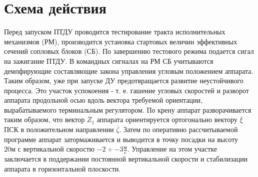 \section{Схема действия}
Перед запуском ПТДУ проводится тестирование тракта исполнительных механизмов (РМ), производится установка стартовых величин эффективных сечений сопловых блоков (СБ). По завершению тестового режима подается сигал на зажигание ПТДУ. В командных сигналах на РМ СБ учитываются демпфирующие составляющие закона управления угловым положением аппарата. Таким образом, уже при запуске ДУ предотвращается развитие неустойчивого процесса. Это участок успокоения - т. е. гашение угловых скоростей и разворот аппарата продольной осью вдоль вектора требуемой ориентации, вырабатываемого терминальным регулятором. По крену аппарат разворачивается таким образом, что вектор $\overline{Z}_1$ аппарата ориентируется ортогонально вектору $\overline{\xi}$ ПСК в положительном направлении $\overline{\zeta}$. Затем по оперативно рассчитываемой программе аппарат затормаживается и выводится в точку посадки на высоту ~ $20 \text{м}$ с вертикальной скоростю $-2 \div -3 \frac{\text{м}}{\text{c}}$. Управление на этом участке заключается в поддержании постоянной вертикальной скорости и стабилизации аппарата в горизонтальной плоскости.

\clearpage